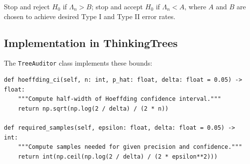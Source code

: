 Stop and reject $H_0$ if $\Lambda_n > B$; stop and accept $H_0$ if $\Lambda_n < A$, where $A$ and $B$ are chosen to achieve desired Type I and Type II error rates.

\subsection{Implementation in ThinkingTrees}

The \texttt{TreeAuditor} class implements these bounds:

\begin{lstlisting}
def hoeffding_ci(self, n: int, p_hat: float, delta: float = 0.05) -> float:
    """Compute half-width of Hoeffding confidence interval."""
    return np.sqrt(np.log(2 / delta) / (2 * n))

def required_samples(self, epsilon: float, delta: float = 0.05) -> int:
    """Compute samples needed for given precision and confidence."""
    return int(np.ceil(np.log(2 / delta) / (2 * epsilon**2)))
\end{lstlisting}
